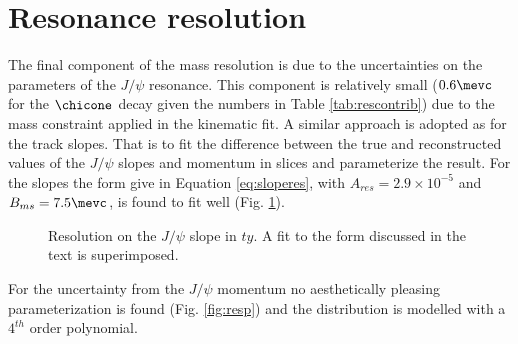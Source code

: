 \section{Resonance resolution}
\label{sec:res}
% 
The final component of the mass resolution is due to the uncertainties
on the parameters of the $J/\psi$ resonance. This component is
relatively small ($0.6 \mevc$ for the $\chicone$ decay given the
numbers in Table \ref{tab:rescontrib}) due to the mass constraint applied in the kinematic
fit. A similar approach is adopted as for the track slopes. That is to
fit the difference between the true and reconstructed values of the
$J/\psi$ slopes and momentum in slices and parameterize the
result. For the slopes the form give in Equation \ref{eq:sloperes}, with $A_{res} = 2.9 \times 10^{-5}$ and $B_{ms} =
7.5 \mevc$, is found to fit well (Fig. \ref{fig:resty}).  
%
\begin{figure}[htb!]
\begin{center}
\caption{\small Resolution on the $J/\psi$ slope in $ty$. A fit to the
  form discussed in the text is superimposed.} 
\label{fig:resty}
\end{center}
\end{figure}

For the uncertainty from the $J/\psi$ momentum no aesthetically pleasing
parameterization is found (Fig. \ref{fig:resp}) and the distribution is
modelled with a $4^{th}$ order polynomial.

